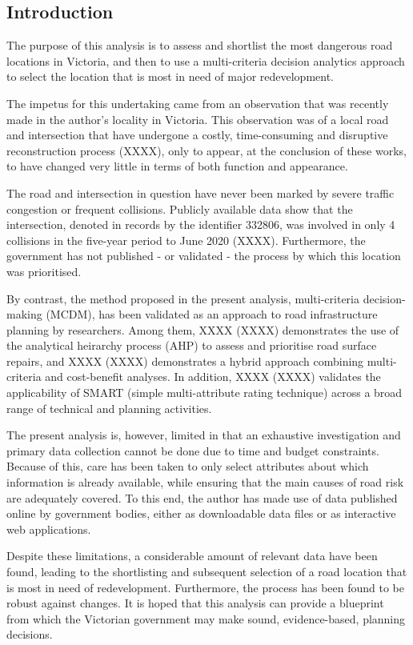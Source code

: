 \documentclass[11pt, a4paper]{article}
\begin{document}
    \subsection{Introduction}

    The purpose of this analysis is to assess and shortlist the most dangerous road locations in Victoria, and then to use a multi-criteria decision analytics approach to select the location that is most in need of major redevelopment.

    The impetus for this undertaking came from an observation that was recently made in the author's locality in Victoria. This observation was of a local road and intersection that have undergone a costly, time-consuming and disruptive reconstruction process (XXXX), only to appear, at the conclusion of these works, to have changed very little in terms of both function and appearance.

    The road and intersection in question have never been marked by severe traffic congestion or frequent collisions. Publicly available data show that the intersection, denoted in records by the identifier 332806, was involved in only 4 collisions in the five-year period to June 2020 (XXXX). Furthermore, the government has not published - or validated - the process by which this location was prioritised.

    By contrast, the method proposed in the present analysis, multi-criteria decision-making (MCDM), has been validated as an approach to road infrastructure planning by researchers. Among them, XXXX (XXXX) demonstrates the use of the analytical heirarchy process (AHP) to assess and prioritise road surface repairs, and XXXX (XXXX) demonstrates a hybrid approach combining multi-criteria and cost-benefit analyses. In addition, XXXX (XXXX) validates the applicability of SMART (simple multi-attribute rating technique) across a broad range of technical and planning activities.

    The present analysis is, however, limited in that an exhaustive investigation and primary data collection cannot be done due to time and budget constraints. Because of this, care has been taken to only select attributes about which information is already available, while ensuring that the main causes of road risk are adequately covered. To this end, the author has made use of data published online by government bodies, either as downloadable data files or as interactive web applications.

    Despite these limitations, a considerable amount of relevant data have been found, leading to the shortlisting and subsequent selection of a road location that is most in need of redevelopment. Furthermore, the process has been found to be robust against changes. It is hoped that this analysis can provide a blueprint from which the Victorian government may make sound, evidence-based, planning decisions.
\end{document}
